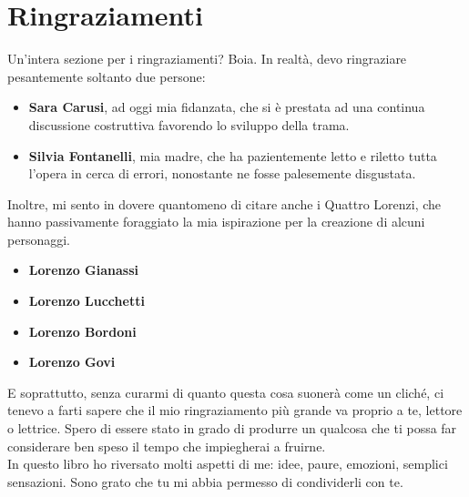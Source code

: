 \documentclass[12pt]{book}
\begin{document}
\section*{Ringraziamenti}

Un'intera sezione per i ringraziamenti? Boia. In realtà, devo ringraziare pesantemente soltanto due persone:

\begin{itemize}
	\item \textbf{Sara Carusi}, ad oggi mia fidanzata, che si è prestata ad una continua discussione costruttiva favorendo lo sviluppo della trama.
	\item \textbf{Silvia Fontanelli}, mia madre, che ha pazientemente letto e riletto tutta l'opera in cerca di errori, nonostante ne fosse palesemente disgustata.
\end{itemize}

Inoltre, mi sento in dovere quantomeno di citare anche i Quattro Lorenzi, che hanno passivamente foraggiato la mia ispirazione per la creazione di alcuni personaggi.

\begin{itemize}
	\item \textbf{Lorenzo Gianassi}
	\item \textbf{Lorenzo Lucchetti}
	\item \textbf{Lorenzo Bordoni}
	\item \textbf{Lorenzo Govi}
\end{itemize}

E soprattutto, senza curarmi di quanto questa cosa suonerà come un cliché, ci tenevo a farti sapere che il mio ringraziamento più grande va proprio a te, lettore o lettrice. Spero di essere stato in grado di produrre un qualcosa che ti possa far considerare ben speso il tempo che impiegherai a fruirne. \\

In questo libro ho riversato molti aspetti di me: idee, paure, emozioni, semplici sensazioni. Sono grato che tu mi abbia permesso di condividerli con te. \\

\newpage
\tableofcontents
\newpage

































\end{document}
